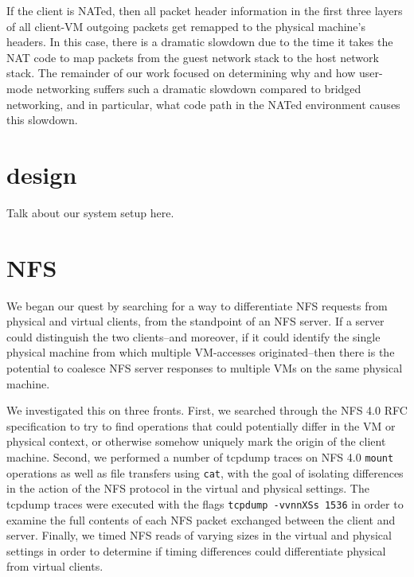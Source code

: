\documentclass[11pt,pdftex,twocolumn]{article}
\begin{document}
If the client is NATed, then all packet header information in the first three layers of all client-VM outgoing packets get remapped to the physical machine's headers. In this case, there is a dramatic slowdown due to the time it takes the NAT code to map packets from the guest network stack to the host network stack. The remainder of our work focused on determining why and how user-mode networking suffers such a dramatic slowdown compared to bridged networking, and in particular, what code path in the NATed environment causes this slowdown.


%

\section{design}
Talk about our system setup here. 

\section{NFS}
We began our quest by searching for a way to differentiate NFS requests from physical and virtual clients, from the standpoint of an NFS server. If a server could distinguish the two clients--and moreover, if it could identify the single physical machine from which multiple VM-accesses originated--then there is the potential to coalesce NFS server responses to multiple VMs on the same physical machine. 

We investigated this on three fronts. First, we searched through the NFS 4.0 RFC specification to try to find operations that could potentially differ in the VM or physical context, or otherwise somehow uniquely mark the origin of the client machine. Second, we performed a number of tcpdump traces on NFS 4.0 \texttt{mount} operations as well as file transfers using \texttt{cat}, with the goal of isolating differences in the action of the NFS protocol in the virtual and physical settings. The tcpdump traces were executed with the flags \texttt{tcpdump -vvnnXSs 1536} in order to examine the full contents of each NFS packet exchanged between the client and server. Finally, we timed NFS reads of varying sizes in the virtual and physical settings in order to determine if timing differences could differentiate physical from virtual clients. 
\end{document}
